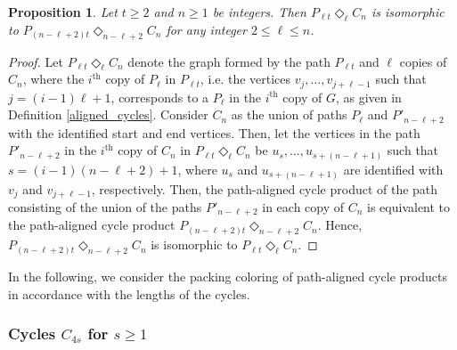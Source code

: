 \documentclass{article}
\newtheorem{prop}[theorem]{Proposition}
\begin{document}
\begin{prop}\label{prop:Cn}
    Let $t \ge 2$ and $n \ge 1$ be integers. 
    Then $P_{\ell t}\Diamond_{\ell} C_n$ is isomorphic to $P_{(n-\ell +2)t}\Diamond_{n-\ell+2} C_n$ for any integer $2 \leq \ell \leq n$.
\end{prop}
\begin{proof}
Let 
\( P_{\ell t} \Diamond_{\ell} C_n \) denote the graph formed by the path \( P_{\ell t} \) and \(  \ell  \) copies of \( C_n \), where the $i^{\text{th}}$ copy of $P_{\ell}$ in $P_{\ell t}$, i.e. the vertices \( v_j, \ldots, v_{j+\ell -1} \) such that \( j = (i-1)\ell + 1 \),  corresponds to a $P_{\ell}$ in the $i^{\text{th}}$ copy of \( G \), as given in Definition \ref{aligned_cycles}. Consider $C
_n$ as the union of paths $P_{\ell}$ and $P'_{n-\ell +2}$ with the identified start and end vertices. Then, let the vertices in the path $P'_{n-\ell +2}$ in the $i^{\text{th}}$ copy of $C_n$ in \( P_{\ell t} \Diamond_{\ell} C_n \) be \( u_s, \ldots, u_{s+(n-\ell+1)}\) such that $s=(i-1)(n-\ell+2)+1$, where $u_s$ and $u_{s+(n-\ell +1)}$ are identified with $v_j$ and $v_{j+\ell -1}$, respectively. Then, the path-aligned cycle product of the path consisting of the union of the paths $P'_{n-\ell +2}$ in each copy of $C_n$ is equivalent to the path-aligned cycle product $P_{(n-\ell +2)t}\Diamond_{n-\ell +2} C_n$. Hence, $P_{(n-\ell +2)t}\Diamond_{n-\ell +2} C_n$ is isomorphic to $P_{\ell t}\Diamond_{\ell} C_n$.
\end{proof} 


In the following, we consider the packing coloring of path-aligned cycle products in accordance with the lengths of the cycles.


\subsubsection{Cycles $C_{4s}$ for $s \geq 1 $} 
\end{document}
